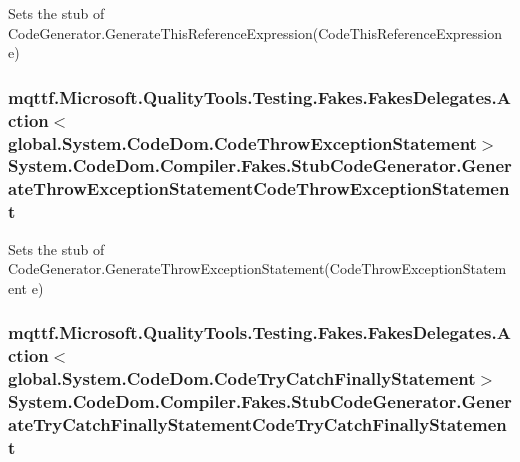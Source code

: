 Sets the stub of Code\-Generator.\-Generate\-This\-Reference\-Expression(\-Code\-This\-Reference\-Expression e)

\hypertarget{class_system_1_1_code_dom_1_1_compiler_1_1_fakes_1_1_stub_code_generator_aed1e874894126aea98885986eab06020}{
\subsubsection[{Generate\-Throw\-Exception\-Statement\-Code\-Throw\-Exception\-Statement}]{\setlength{\rightskip}{0pt plus 5cm}mqttf.\-Microsoft.\-Quality\-Tools.\-Testing.\-Fakes.\-Fakes\-Delegates.\-Action$<$global.\-System.\-Code\-Dom.\-Code\-Throw\-Exception\-Statement$>$ System.\-Code\-Dom.\-Compiler.\-Fakes.\-Stub\-Code\-Generator.\-Generate\-Throw\-Exception\-Statement\-Code\-Throw\-Exception\-Statement}}\label{class_system_1_1_code_dom_1_1_compiler_1_1_fakes_1_1_stub_code_generator_aed1e874894126aea98885986eab06020}


Sets the stub of Code\-Generator.\-Generate\-Throw\-Exception\-Statement(\-Code\-Throw\-Exception\-Statement e)

\hypertarget{class_system_1_1_code_dom_1_1_compiler_1_1_fakes_1_1_stub_code_generator_a7af7613c2f04b93ae5516c132ba0b2dd}{
\subsubsection[{Generate\-Try\-Catch\-Finally\-Statement\-Code\-Try\-Catch\-Finally\-Statement}]{\setlength{\rightskip}{0pt plus 5cm}mqttf.\-Microsoft.\-Quality\-Tools.\-Testing.\-Fakes.\-Fakes\-Delegates.\-Action$<$global.\-System.\-Code\-Dom.\-Code\-Try\-Catch\-Finally\-Statement$>$ System.\-Code\-Dom.\-Compiler.\-Fakes.\-Stub\-Code\-Generator.\-Generate\-Try\-Catch\-Finally\-Statement\-Code\-Try\-Catch\-Finally\-Statement}}\label{class_system_1_1_code_dom_1_1_compiler_1_1_fakes_1_1_stub_code_generator_a7af7613c2f04b93ae5516c132ba0b2dd}


